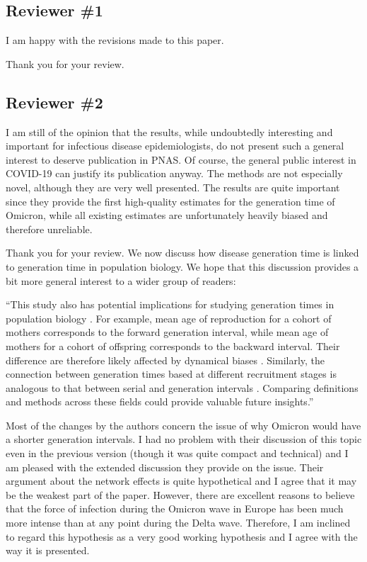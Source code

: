 \documentclass[12pt]{article}
\newcommand{\rev}{\subsection*}
\newcommand{\revtext}{\textsf}
\begin{document}
\rev{Reviewer \#1}

\revtext{I am happy with the revisions made to this paper.}

Thank you for your review.

\rev{Reviewer \#2}

\revtext{I am still of the opinion that the results, while undoubtedly interesting and important for infectious disease epidemiologists, do not present such a general interest to deserve publication in PNAS. Of course, the general public interest in COVID-19 can justify its publication anyway. The methods are not especially novel, although they are very well presented. The results are quite important since they provide the first high-quality estimates for the generation time of Omicron, while all existing estimates are unfortunately heavily biased and therefore unreliable.}

Thank you for your review. We now discuss how disease generation time is linked to generation time in population biology. We hope that this discussion provides a bit more general interest to a wider group of readers:

``This study also has potential implications for studying generation times in population biology \citep{leslie1966intrinsic,mertz1971mathematical,caswell2009stage,steiner2014generation}.
For example, mean age of reproduction for a cohort of mothers corresponds to the forward generation interval, while mean age of mothers for a cohort of offspring corresponds to the backward interval.
Their difference are therefore likely affected by dynamical biases \citep{jonasson2022unifying}.
Similarly, the connection between generation times based at different recruitment stages is analogous to that between serial and generation intervals \citep{lebreton2005age,bienvenu2015new,giaimo2023generation}.
Comparing definitions and methods across these fields could provide valuable future insights.''

\revtext{Most of the changes by the authors concern the issue of why Omicron would have a shorter generation intervals. I had no problem with their discussion of this topic even in the previous version (though it was quite compact and technical) and I am pleased with the extended discussion they provide on the issue. Their argument about the network effects is quite hypothetical and I agree that it may be the weakest part of the paper. However, there are excellent reasons to believe that the force of infection during the Omicron wave in Europe has been much more intense than at any point during the Delta wave. Therefore, I am inclined to regard this hypothesis as a very good working hypothesis and I agree with the way it is presented.}
\end{document}
